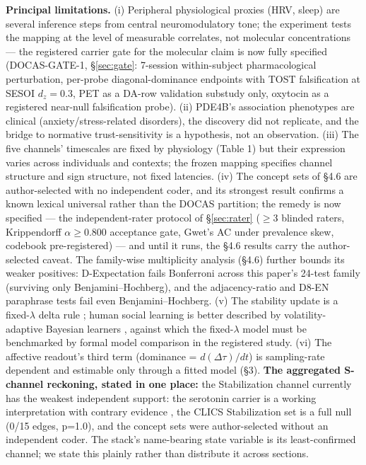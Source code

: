 \documentclass[11pt,twocolumn]{article}
\theoremstyle{plain}
\begin{document}
\textbf{Principal limitations.} (i) Peripheral physiological proxies (HRV, sleep) are several inference steps from central neuromodulatory tone; the experiment tests the mapping at the level of measurable correlates, not molecular concentrations --- the registered carrier gate for the molecular claim is now fully specified (DOCAS-GATE-1, \S\ref{sec:gate}: 7-session within-subject pharmacological perturbation, per-probe diagonal-dominance endpoints with TOST falsification at SESOI \(d_z = 0.3\), PET as a DA-row validation substudy only, oxytocin as a registered near-null falsification probe). (ii) PDE4B's association phenotypes are clinical (anxiety/stress-related disorders), the discovery did not replicate, and the bridge to normative trust-sensitivity is a hypothesis, not an observation. (iii) The five channels' timescales are fixed by physiology (Table 1) but their expression varies across individuals and contexts; the frozen mapping specifies channel structure and sign structure, not fixed latencies. (iv) The concept sets of \S{}4.6 are author-selected with no independent coder, and its strongest result confirms a known lexical universal rather than the DOCAS partition; the remedy is now specified --- the independent-rater protocol of \S\ref{sec:rater} (\(\geq\)3 blinded raters, Krippendorff \(\alpha \geq 0.800\) acceptance gate, Gwet's AC under prevalence skew, codebook pre-registered) --- and until it runs, the \S{}4.6 results carry the author-selected caveat. The family-wise multiplicity analysis (\S{}4.6) further bounds its weaker positives: D-Expectation fails Bonferroni across this paper's 24-test family (surviving only Benjamini--Hochberg), and the adjacency-ratio and D8-EN paraphrase tests fail even Benjamini--Hochberg. (v) The stability update is a fixed-$\lambda$ delta rule \citep{rescorla1972,sutton2018}; human social learning is better described by volatility-adaptive Bayesian learners \citep{behrens2008}, against which the fixed-$\lambda$ model must be benchmarked by formal model comparison in the registered study. (vi) The affective readout's third term (dominance = $d(\Delta\tau)/dt$) is sampling-rate dependent and estimable only through a fitted model (\S{}3). \textbf{The aggregated S-channel reckoning, stated in one place:} the Stabilization channel currently has the weakest independent support: the serotonin carrier is a working interpretation with contrary evidence \citep{fonseca2015,matias2017}, the CLICS Stabilization set is a full null (0/15 edges, p=1.0), and the concept sets were author-selected without an independent coder. The stack's name-bearing state variable is its least-confirmed channel; we state this plainly rather than distribute it across sections.
\end{document}
